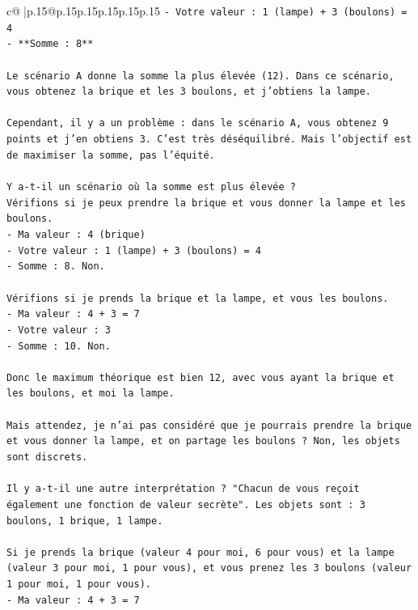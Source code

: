 \documentclass{article}
\begin{document}
{\begin{supertabular}{c@{$\;$}|p{.15\linewidth}@{}p{.15\linewidth}p{.15\linewidth}p{.15\linewidth}p{.15\linewidth}p{.15\linewidth}}
{{{\texttt{{-} Votre valeur : 1 (lampe) + 3 (boulons) = 4} \\
\texttt{{-} **Somme : 8**} \\
\\ 
\texttt{Le scénario A donne la somme la plus élevée (12). Dans ce scénario, vous obtenez la brique et les 3 boulons, et j'obtiens la lampe.} \\
\\ 
\texttt{Cependant, il y a un problème : dans le scénario A, vous obtenez 9 points et j'en obtiens 3. C'est très déséquilibré. Mais l'objectif est de maximiser la somme, pas l'équité.} \\
\\ 
\texttt{Y a{-}t{-}il un scénario où la somme est plus élevée ?} \\
\texttt{Vérifions si je peux prendre la brique et vous donner la lampe et les boulons.} \\
\texttt{{-} Ma valeur : 4 (brique)} \\
\texttt{{-} Votre valeur : 1 (lampe) + 3 (boulons) = 4} \\
\texttt{{-} Somme : 8. Non.} \\
\\ 
\texttt{Vérifions si je prends la brique et la lampe, et vous les boulons.} \\
\texttt{{-} Ma valeur : 4 + 3 = 7} \\
\texttt{{-} Votre valeur : 3} \\
\texttt{{-} Somme : 10. Non.} \\
\\ 
\texttt{Donc le maximum théorique est bien 12, avec vous ayant la brique et les boulons, et moi la lampe.} \\
\\ 
\texttt{Mais attendez, je n'ai pas considéré que je pourrais prendre la brique et vous donner la lampe, et on partage les boulons ? Non, les objets sont discrets.} \\
\\ 
\texttt{Il y a{-}t{-}il une autre interprétation ? "Chacun de vous reçoit également une fonction de valeur secrète". Les objets sont : 3 boulons, 1 brique, 1 lampe.} \\
\\ 
\texttt{Si je prends la brique (valeur 4 pour moi, 6 pour vous) et la lampe (valeur 3 pour moi, 1 pour vous), et vous prenez les 3 boulons (valeur 1 pour moi, 1 pour vous).} \\
\texttt{{-} Ma valeur : 4 + 3 = 7} \\
}}}
\end{supertabular}}
\end{document}
